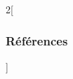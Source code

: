 \documentclass[xcolor=table]{beamer}
\begin{document}
%
%
%	
%	
%	
%

\nocite{*}
%
% 

\begin{multicols*}{2}[\frametitle{Références}]%
	\tiny
	
	
\end{multicols*}
\end{document}
